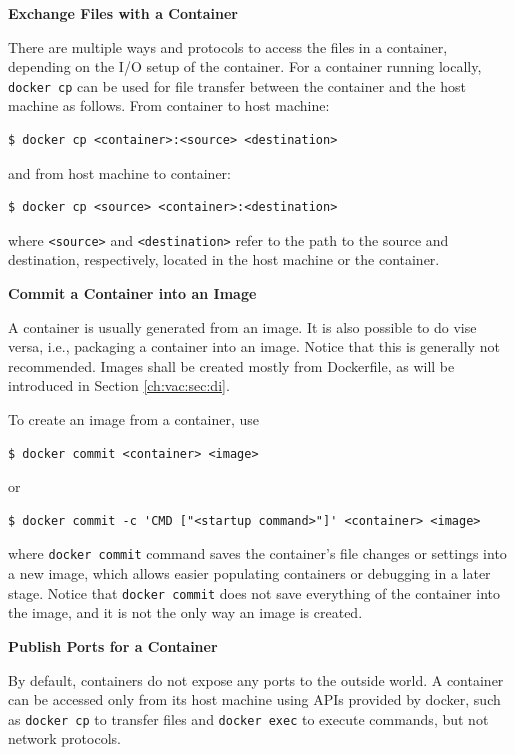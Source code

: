 \vspace{0.1in}
\noindent \textbf{Exchange Files with a Container}
\vspace{0.1in}

There are multiple ways and protocols to access the files in a container, depending on the I/O setup of the container. For a container running locally, \verb|docker cp| can be used for file transfer between the container and the host machine as follows. From container to host machine:
\begin{lstlisting}
$ docker cp <container>:<source> <destination>
\end{lstlisting}
and from host machine to container:
\begin{lstlisting}
$ docker cp <source> <container>:<destination>
\end{lstlisting}
where \verb|<source>| and \verb|<destination>| refer to the path to the source and destination, respectively, located in the host machine or the container.

\vspace{0.1in}
\noindent \textbf{Commit a Container into an Image}
\vspace{0.1in}

A container is usually generated from an image. It is also possible to do vise versa, i.e., packaging a container into an image. Notice that this is generally not recommended. Images shall be created mostly from Dockerfile, as will be introduced in Section \ref{ch:vac:sec:di}.

To create an image from a container, use
\begin{lstlisting}
$ docker commit <container> <image>
\end{lstlisting}
or
\begin{lstlisting}
$ docker commit -c 'CMD ["<startup command>"]' <container> <image>
\end{lstlisting}
where \verb|docker commit| command saves the container's file changes or settings into a new image, which allows easier populating containers or debugging in a later stage. Notice that \verb|docker commit| does not save everything of the container into the image, and it is not the only way an image is created.

\vspace{0.1in}
\noindent \textbf{Publish Ports for a Container}
\vspace{0.1in}

By default, containers do not expose any ports to the outside world. A container can be accessed only from its host machine using APIs provided by docker, such as \verb|docker cp| to transfer files and \verb|docker exec| to execute commands, but not network protocols. 

